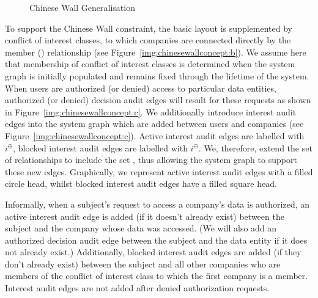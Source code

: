 \documentclass{article}
\newcommand{\audita}[1]{\ensuremath{#1^\oplus}}
\newcommand{\auditd}[1]{\ensuremath{#1^\ominus}}
\newcommand{\interesta}{\ensuremath{i^\oplus}}
\newcommand{\interestb}{\ensuremath{i^\ominus}}
\begin{document}
\begin{figure}[!ht]
{
        \label{img:chinesewallconcept:c}
    }
    \caption{Chinese Wall Generalisation}\label{img:chinesewallconcept}
\end{figure}

To support the Chinese Wall constraint, the basic layout is supplemented by conflict of interest classes, to which companies are connected directly by the member () relationship (see Figure~\ref{img:chinesewallconcept:b}).
We assume here that membership of conflict of interest classes is determined when the system graph is initially populated and remains fixed through the lifetime of the system.
When users are authorized (or denied) access to particular data entities, authorized (or denied) decision audit edges will result for these requests as shown in Figure~\ref{img:chinesewallconcept:c}.
We additionally introduce interest audit edges into the system graph which are added between users and companies (see Figure~\ref{img:chinesewallconcept:c}).
Active interest audit edges are labelled with \interesta, blocked interest audit edges are labelled with \interestb.
We, therefore, extend the set of relationships to include the set , thus allowing the system graph to support these new edges.
Graphically, we represent active interest audit edges with a filled circle head, whilst blocked interest audit edges have a filled square head.

Informally, when a subject's request to access a company's data is authorized, an active interest audit edge is added (if it doesn't already exist) between the subject and the company whose data was accessed.
(We will also add an authorized decision audit edge between the subject and the data entity if it does not already exist.)
Additionally, blocked interest audit edges are added (if they don't already exist) between the subject and all other companies who are members of the conflict of interest class to which the first company is a member.
Interest audit edges are not added after denied authorization requests.
\end{document}
